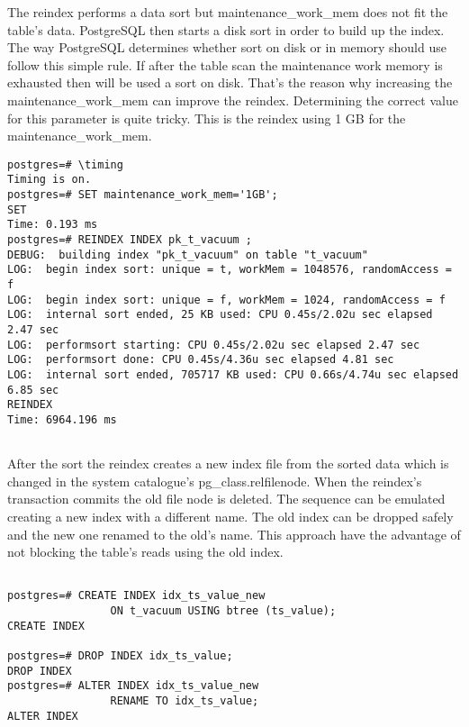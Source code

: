 The reindex performs a data sort but maintenance\_work\_mem does not fit the table's data. PostgreSQL 
then starts a disk sort in order to build up the index. The way PostgreSQL determines whether sort 
on disk or in memory should use follow this simple rule. If after the table scan the maintenance work 
memory is exhausted then will be used a sort on disk. That's the reason why increasing the 
maintenance\_work\_mem  can improve the reindex. Determining the correct value for this parameter is 
quite tricky.\newline
This is the reindex using 1 GB for the maintenance\_work\_mem.

\begin{lstlisting}[style=pgsql]
postgres=# \timing
Timing is on.
postgres=# SET maintenance_work_mem='1GB';
SET
Time: 0.193 ms
postgres=# REINDEX INDEX pk_t_vacuum ;
DEBUG:  building index "pk_t_vacuum" on table "t_vacuum"
LOG:  begin index sort: unique = t, workMem = 1048576, randomAccess = f
LOG:  begin index sort: unique = f, workMem = 1024, randomAccess = f
LOG:  internal sort ended, 25 KB used: CPU 0.45s/2.02u sec elapsed 2.47 sec
LOG:  performsort starting: CPU 0.45s/2.02u sec elapsed 2.47 sec
LOG:  performsort done: CPU 0.45s/4.36u sec elapsed 4.81 sec
LOG:  internal sort ended, 705717 KB used: CPU 0.66s/4.74u sec elapsed 6.85 sec
REINDEX
Time: 6964.196 ms


\end{lstlisting}

After the sort the reindex creates a new index file from the sorted data which is changed in the system 
catalogue's pg\_class.relfilenode. When the reindex's transaction commits the old file node is deleted. The 
sequence can be emulated creating a new index with a different name. The old index can be dropped safely 
and the new one renamed to the old's name. This approach have the advantage of not blocking the 
table's reads using the old index.\newline

\begin{lstlisting}[style=pgsql]

postgres=# CREATE INDEX idx_ts_value_new 
                ON t_vacuum USING btree (ts_value);
CREATE INDEX

postgres=# DROP INDEX idx_ts_value;
DROP INDEX
postgres=# ALTER INDEX idx_ts_value_new 
                RENAME TO idx_ts_value;
ALTER INDEX

\end{lstlisting}



